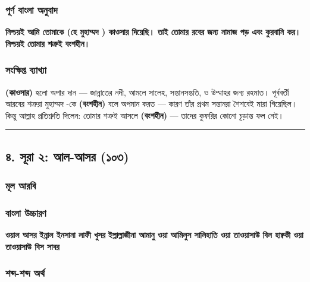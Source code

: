 \subsubsection*{পূর্ণ বাংলা অনুবাদ}
\textbf{নিশ্চয়ই আমি তোমাকে (হে মুহাম্মদ ) কাওসার দিয়েছি। তাই তোমার রবের জন্য নামাজ পড় এবং কুরবানি কর। নিশ্চয়ই তোমার শত্রুই বংশহীন।}

\subsubsection*{সংক্ষিপ্ত ব্যাখ্যা}
\textbf{ (কাওসার)} হলো অপার দান — জান্নাতের নদী, আমলে সালেহ, সন্তানসন্ততি, ও উম্মাহর জন্য রহমাত। পূর্ববর্তী আরবের শত্রুরা মুহাম্মদ -কে \textbf{ (বংশহীন)} বলে অপমান করত — কারণ তাঁর প্রথম সন্তানরা শৈশবেই মারা গিয়েছিল। কিন্তু আল্লাহ প্রতিশ্রুতি দিলেন: তোমার শত্রুই আসলে \textbf{ (বংশহীন)} — তাদের কুফরির কোনো চূড়ান্ত ফল নেই।

\medskip\hrule\medskip

\subsection*{৪. সূরা ২: আল-আসর (১০৩)}

\subsubsection*{মূল আরবি}
\begin{center}\end{center}
\begin{center}\end{center}
\begin{center}\end{center}

\subsubsection*{বাংলা উচ্চারণ}
\textbf{ওয়াল আসর}
\textbf{ইন্নাল ইনসানা লাফী খুসর}
\textbf{ইল্লাল্লাজীনা আমানু ওয়া আমিলুস সালিহাতি ওয়া তাওয়াসাউ বিল হাক্বকী ওয়া তাওয়াসাউ বিস সাবর}

\subsubsection*{শব্দ-শব্দ অর্থ}

